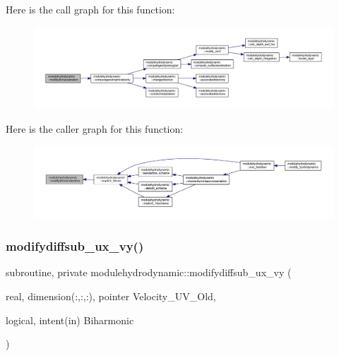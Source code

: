 Here is the call graph for this function\+:\nopagebreak
\begin{figure}[H]
\begin{center}
\leavevmode
\includegraphics[width=350pt]{namespacemodulehydrodynamic_a56519157850cefc5f98f52914553161e_cgraph}
\end{center}
\end{figure}
Here is the caller graph for this function\+:\nopagebreak
\begin{figure}[H]
\begin{center}
\leavevmode
\includegraphics[width=350pt]{namespacemodulehydrodynamic_a56519157850cefc5f98f52914553161e_icgraph}
\end{center}
\end{figure}
\mbox{\label{namespacemodulehydrodynamic_a0a591d70830b196d88bbd8d05d6c86f9}} 
\subsubsection{\texorpdfstring{modifydiffsub\+\_\+ux\+\_\+vy()}{modifydiffsub\_ux\_vy()}}
{\footnotesize\ttfamily subroutine, private modulehydrodynamic\+::modifydiffsub\+\_\+ux\+\_\+vy (\begin{DoxyParamCaption}\item[{real, dimension(\+:,\+:,\+:), pointer}]{Velocity\+\_\+\+U\+V\+\_\+\+Old,  }\item[{logical, intent(in)}]{Biharmonic }\end{DoxyParamCaption})\hspace{0.3cm}{\ttfamily [private]}}

